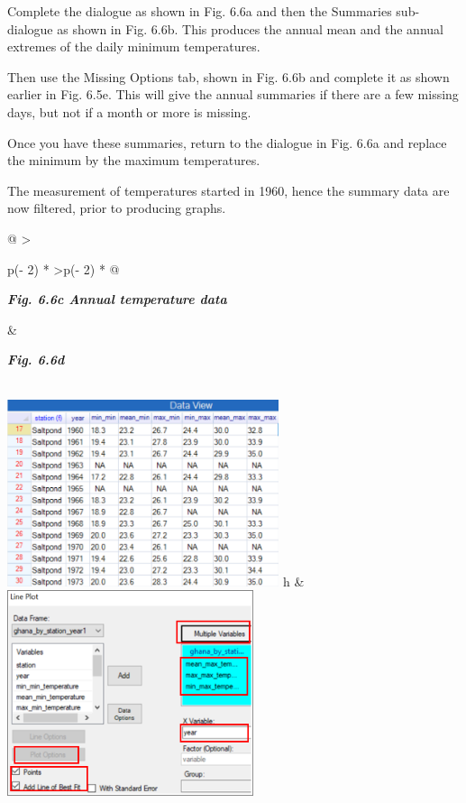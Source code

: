 \documentclass[
  letterpaper,
  DIV=11,
  numbers=noendperiod]{scrreprt}
\begin{document}
Complete the dialogue as shown in Fig. 6.6a and then the Summaries
sub-dialogue as shown in Fig. 6.6b. This produces the annual mean and
the annual extremes of the daily minimum temperatures.

Then use the Missing Options tab, shown in Fig. 6.6b and complete it as
shown earlier in Fig. 6.5e. This will give the annual summaries if there
are a few missing days, but not if a month or more is missing.

Once you have these summaries, return to the dialogue in Fig. 6.6a and
replace the minimum by the maximum temperatures.

The measurement of temperatures started in 1960, hence the summary data
are now filtered, prior to producing graphs.

\begin{longtable}[]{@{}
  >{\raggedright\arraybackslash}p{(\columnwidth - 2\tabcolsep) * }
  >{\centering\arraybackslash}p{(\columnwidth - 2\tabcolsep) * }@{}}
\toprule\noalign{}
\begin{minipage}[b]{\linewidth}\raggedright
\textbf{\emph{Fig. 6.6c Annual temperature data}}
\end{minipage} & \begin{minipage}[b]{\linewidth}\centering
\textbf{\emph{Fig. 6.6d}}
\end{minipage} \\
\midrule\noalign{}
\endhead
\bottomrule\noalign{}
\endlastfoot
\includegraphics[width=3.14016in,height=2.15774in]{figures/Fig6.6c.png}
h &
\includegraphics[width=2.84289in,height=\textheight]{figures/Fig6.6d.png} \\
\end{longtable}
\end{document}
